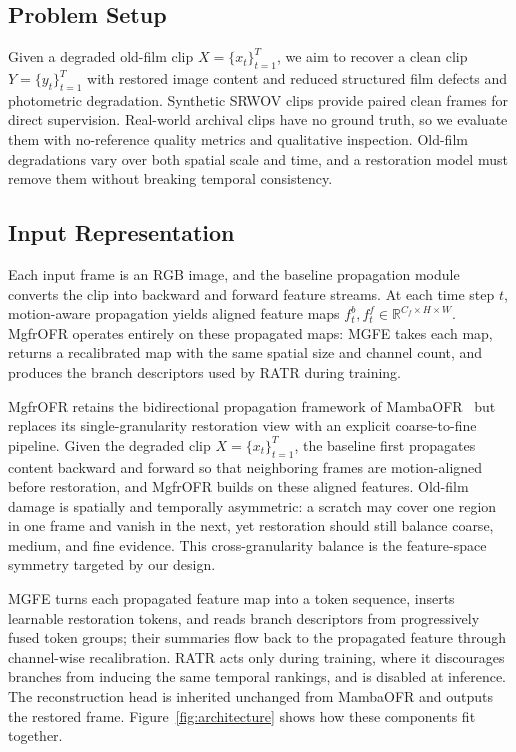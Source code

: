 \documentclass[symmetry,article,submit,pdftex,moreauthors]{Definitions/mdpi}
\begin{document}
\subsection{Problem Setup}
\label{subsec:problem_setup}

Given a degraded old-film clip $X=\{x_t\}_{t=1}^{T}$, we aim to recover a clean clip $Y=\{y_t\}_{t=1}^{T}$ with restored image content and reduced structured film defects and photometric degradation. Synthetic SRWOV clips provide paired clean frames for direct supervision. Real-world archival clips have no ground truth, so we evaluate them with no-reference quality metrics and qualitative inspection. Old-film degradations vary over both spatial scale and time, and a restoration model must remove them without breaking temporal consistency.

\subsection{Input Representation}
\label{subsec:input_representation}

Each input frame is an RGB image, and the baseline propagation module converts the clip into backward and forward feature streams. At each time step $t$, motion-aware propagation yields aligned feature maps $f_t^{b}, f_t^{f} \in \mathbb{R}^{C_f \times H \times W}$. MgfrOFR operates entirely on these propagated maps: MGFE takes each map, returns a recalibrated map with the same spatial size and channel count, and produces the branch descriptors used by RATR during training.

MgfrOFR retains the bidirectional propagation framework of MambaOFR~\cite{mao2025mambaofr} but replaces its single-granularity restoration view with an explicit coarse-to-fine pipeline. Given the degraded clip $X=\{x_t\}_{t=1}^{T}$, the baseline first propagates content backward and forward so that neighboring frames are motion-aligned before restoration, and MgfrOFR builds on these aligned features. Old-film damage is spatially and temporally asymmetric: a scratch may cover one region in one frame and vanish in the next, yet restoration should still balance coarse, medium, and fine evidence. This cross-granularity balance is the feature-space symmetry targeted by our design.

MGFE turns each propagated feature map into a token sequence, inserts learnable restoration tokens, and reads branch descriptors from progressively fused token groups; their summaries flow back to the propagated feature through channel-wise recalibration. RATR acts only during training, where it discourages branches from inducing the same temporal rankings, and is disabled at inference. The reconstruction head is inherited unchanged from MambaOFR and outputs the restored frame. Figure~\ref{fig:architecture} shows how these components fit together.
\end{document}
